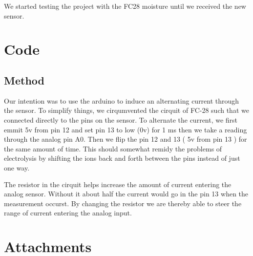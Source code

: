\documentclass{article}
\begin{document}
We started testing the project with the FC28 moisture until we received the new sensor.

\section{Code}

\subsection{Method}

Our intention was to use the arduino to induce an alternating current through the sensor. To simplify things, we cirqumvented the cirquit of FC-28 such that we connected directly to the pins on the sensor. To alternate the current, we first emmit 5v from pin 12 and set pin 13 to low (0v) for 1 ms then we take a reading through the analog pin A0. Then we flip the pin 12 and 13 ( 5v from pin 13 ) for the same amount of time. This should somewhat remidy the problems of electrolysis by shifting the ions back and forth between the pins instead of just one way.

The resistor in the cirquit helps increase the amount of current entering the analog sensor. Without it about half the current would go in the pin 13 when the measurement occurst. By changing the resistor we are thereby able to steer the range of current entering the analog input.

\subsection{}







\section{Attachments}
\pagebreak
{}

\nocite{*}
% 
\end{document}
